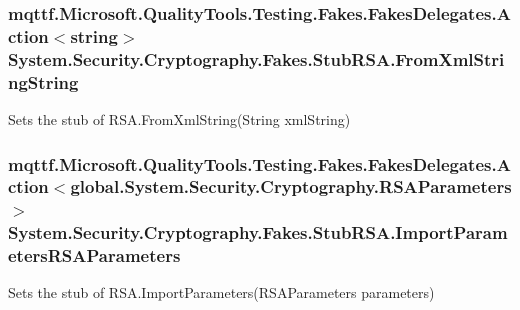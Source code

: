 \hypertarget{class_system_1_1_security_1_1_cryptography_1_1_fakes_1_1_stub_r_s_a_a1a37c9c83323b9f1d231fcf4555cca2d}{
\subsubsection[{From\-Xml\-String\-String}]{\setlength{\rightskip}{0pt plus 5cm}mqttf.\-Microsoft.\-Quality\-Tools.\-Testing.\-Fakes.\-Fakes\-Delegates.\-Action$<$string$>$ System.\-Security.\-Cryptography.\-Fakes.\-Stub\-R\-S\-A.\-From\-Xml\-String\-String}}\label{class_system_1_1_security_1_1_cryptography_1_1_fakes_1_1_stub_r_s_a_a1a37c9c83323b9f1d231fcf4555cca2d}


Sets the stub of R\-S\-A.\-From\-Xml\-String(\-String xml\-String)

\hypertarget{class_system_1_1_security_1_1_cryptography_1_1_fakes_1_1_stub_r_s_a_a85392f54791e886eb8cd253d037e2afd}{
\subsubsection[{Import\-Parameters\-R\-S\-A\-Parameters}]{\setlength{\rightskip}{0pt plus 5cm}mqttf.\-Microsoft.\-Quality\-Tools.\-Testing.\-Fakes.\-Fakes\-Delegates.\-Action$<$global.\-System.\-Security.\-Cryptography.\-R\-S\-A\-Parameters$>$ System.\-Security.\-Cryptography.\-Fakes.\-Stub\-R\-S\-A.\-Import\-Parameters\-R\-S\-A\-Parameters}}\label{class_system_1_1_security_1_1_cryptography_1_1_fakes_1_1_stub_r_s_a_a85392f54791e886eb8cd253d037e2afd}


Sets the stub of R\-S\-A.\-Import\-Parameters(\-R\-S\-A\-Parameters parameters)

